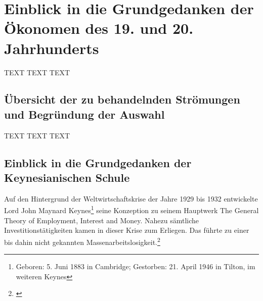\documentclass[
        onecolumn,
        a4paper,
        abstracton,
        parskip=half
        ,final
        ]{scrartcl}
\begin{document}
\clearpage





\section{Einblick in die Grundgedanken der {\"O}konomen des 19. und 20. Jahrhunderts}
  \label{sec3:stroemungen}
  TEXT TEXT TEXT


\subsection{{\"U}bersicht der zu behandelnden Str{\"o}mungen und Begr{\"u}ndung der Auswahl} %

TEXT TEXT TEXT




\subsection{Einblick in die Grundgedanken der Keynesianischen Schule} %

Auf den Hintergrund der Weltwirtschaftskrise der Jahre 1929 bis 1932 entwickelte Lord John Maynard Keynes\footnote[14]{Geboren: 5. Juni 1883 in Cambridge; Gestorben: 21. April 1946 in Tilton, im weiteren Keynes} seine Konzeption zu seinem Hauptwerk \frqq The General Theory of Employment, Interest and Money\flqq. Nahezu s{\"a}mtliche Investitionst{\"a}tigkeiten kamen in dieser Krise zum Erliegen. Das f{\"u}hrte zu einer bis dahin nicht gekannten Massenarbeitslosigkeit.\footnote[601]{\citep*[S.203]{peters2000}}
\end{document}

